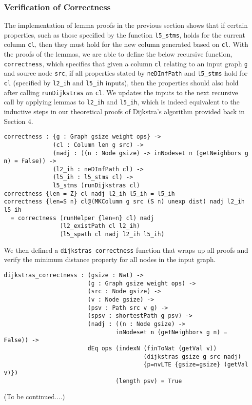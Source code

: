 \subsubsection{Verification of Correctness}
The implementation of lemma proofs in the previous section shows that if certain properties, such as those specified by the function \texttt{l5\_stms}, holds for the current column \texttt{cl}, then they must hold for the new column generated based on \texttt{cl}. With the proofs of the lemmas, we are able to define the below recursive function, \texttt{correctness}, which specifies that given a column \texttt{cl} relating to an input graph \texttt{g} and source node \texttt{src}, if all properties stated by \texttt{neDInfPath} and \texttt{l5\_stms} hold for \texttt{cl} (specified by \texttt{l2\_ih} and \texttt{l5\_ih} inputs), then the properties should also hold after calling \texttt{runDijkstras} on \texttt{cl}. We updates the inputs to the next recursive call by applying lemmas to \texttt{l2\_ih} and \texttt{l5\_ih}, which is indeed equivalent to the inductive steps in our theoretical proofs of Dijkstra's algorithm provided back in Section 4. 
\\
\begin{lstlisting}
correctness : {g : Graph gsize weight ops} ->
              (cl : Column len g src) ->
              (nadj : ((n : Node gsize) -> inNodeset n (getNeighbors g n) = False)) ->
              (l2_ih : neDInfPath cl) ->
              (l5_ih : l5_stms cl) ->
              l5_stms (runDijkstras cl)
correctness {len = Z} cl nadj l2_ih l5_ih = l5_ih
correctness {len=S n} cl@(MKColumn g src (S n) unexp dist) nadj l2_ih l5_ih
  = correctness (runHelper {len=n} cl) nadj 
  				(l2_existPath cl l2_ih) 
  				(l5_spath cl nadj l2_ih l5_ih)
\end{lstlisting}
We then defined a \texttt{dijkstras\_correctness} function that wraps up all proofs and verify the minimum distance property for all nodes in the input graph. 
\begin{lstlisting}
dijkstras_correctness : (gsize : Nat) ->
                        (g : Graph gsize weight ops) ->
                        (src : Node gsize) ->
                        (v : Node gsize) ->
                        (psv : Path src v g) ->
                        (spsv : shortestPath g psv) ->
                        (nadj : ((n : Node gsize) -> 
                        		inNodeset n (getNeighbors g n) = False)) ->
                        dEq ops (indexN (finToNat (getVal v)) 
                        				(dijkstras gsize g src nadj) 
                        				{p=nvLTE {gsize=gsize} (getVal v)}) 
                        		(length psv) = True
\end{lstlisting}

(To be continued....)